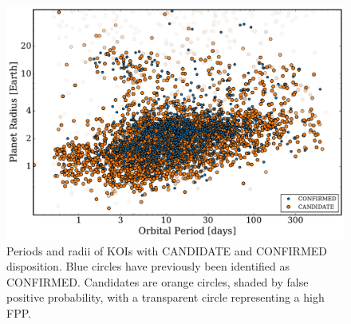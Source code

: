 \documentclass{emulateapj}
\newcommand{\figlabel}[1]{\label{fig:#1}}
\begin{document}
\begin{figure}[p]
\begin{center}
\includegraphics[width=7in]{figures/fppalpha.pdf}
\end{center}
\caption{Periods and radii of KOIs with CANDIDATE and CONFIRMED disposition.  
  Blue circles have previously been identified as CONFIRMED.  Candidates are orange circles, 
  shaded by false positive probability, with 
  a transparent circle representing a high FPP. 
  \figlabel{rpcand}}
\end{figure}
\end{document}
